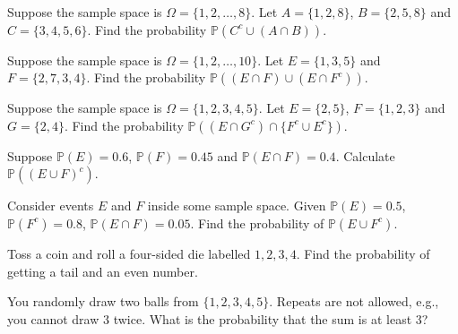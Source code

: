 \documentclass[../main.tex]{subfiles}
\begin{document}
\clearpage

\begin{example}
  Suppose the sample space is \(\Omega = \{1,2,\ldots,8\}\). Let \(A = \{1,2,8\}\), \(B = \{2,5,8\}\) and \(C = \{3,4,5,6\}\).  Find the probability \(\mathbb{P}( C^{c} \cup (A \cap B) )\).
  
\end{example}

\begin{example}
  Suppose the sample space is \(\Omega = \{1,2,\ldots,10\}\).  Let \(E = \{1,3,5\}\) and \(F = \{2,7,3,4\}\). Find the probability \(\mathbb{P}( (E \cap F) \cup (E \cap F^{c})) \).
\end{example}

\begin{example}
  Suppose the sample space is \(\Omega = \{1,2,3,4,5\}\).  Let \(E = \{2,5\}\), \(F = \{1,2,3\}\) and \(G = \{2,4\}\). Find the probability \(\mathbb{P}( (E \cap G^{c}) \cap \{ F^{c} \cup E^{c} \}) \).
\end{example}
\clearpage

\begin{example}
  Suppose \(\mathbb{P}(E) = 0.6\), \(\mathbb{P}(F) = 0.45\) and \(\mathbb{P}(E \cap F) = 0.4\). Calculate \(\mathbb{P}( (E \cup F)^{c})\).
\end{example}

\begin{example}
  Consider events \(E\) and \(F\) inside some sample space. Given \(\mathbb{P}(E) = 0.5\), \(\mathbb{P}(F^{c}) = 0.8\), \(\mathbb{P}(E \cap F) = 0.05\). Find the probability of \(\mathbb{P}(E \cup F^{c})\).
\end{example}

\begin{example}
  Toss a coin and roll a four-sided die labelled \(1,2,3,4\).  Find the probability of getting a tail and an even number.

\end{example}

\begin{example}
  You randomly draw two balls from \(\{1,2,3,4,5\}\).  Repeats are not allowed, e.g., you cannot draw \(3\) twice.  What is the probability that the sum is at least \(3\)?

\end{example}


\clearpage
\end{document}
